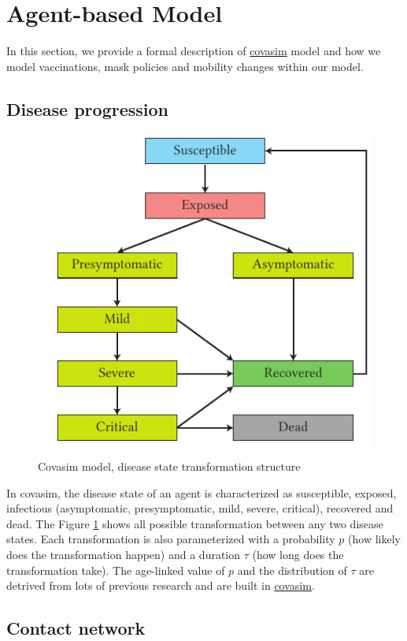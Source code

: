 \section{Agent-based Model}
In this section, we provide a formal description of \href{https://github.com/InstituteforDiseaseModeling/covasim}{covasim} model \citep{kerr2021covasim} and how we model vaccinations, mask policies and mobility changes within our model.
\subsection{Disease progression}
\begin{figure}
	\centering
	\includegraphics{model/seir.pdf}
	\caption{Covasim model, disease state transformation structure}
	\label{seir}
\end{figure}

In covasim, the disease state of an agent is characterized as susceptible, exposed, infectious (asymptomatic, presymptomatic, mild, severe, critical), recovered and dead. The Figure \ref{seir} shows all possible transformation between any two disease states. Each transformation is also parameterized with a probability $p$ (how likely does the transformation happen) and a duration $\tau$ (how long does the transformation take). The age-linked value of $p$ and the distribution of $\tau$ are detrived from lots of previous research and are built in \href{https://github.com/InstituteforDiseaseModeling/covasim}{covasim}.

\subsection{Contact network}

